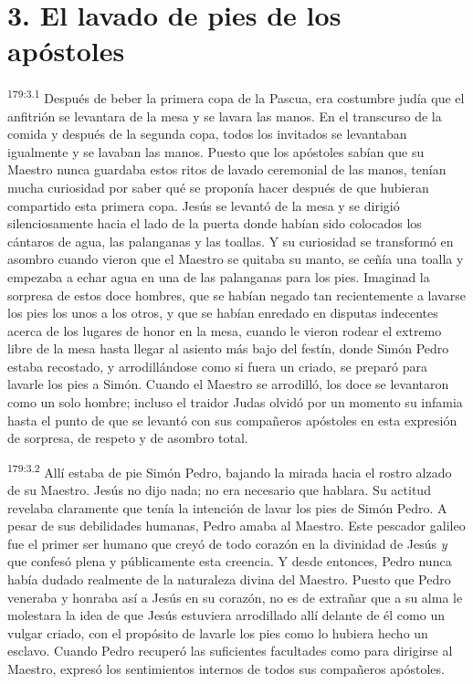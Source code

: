 \section*{3. El lavado de pies de los apóstoles}
\par 
\textsuperscript{179:3.1} Después de beber la primera copa de la Pascua, era costumbre judía que el anfitrión se levantara de la mesa y se lavara las manos. En el transcurso de la comida y después de la segunda copa, todos los invitados se levantaban igualmente y se lavaban las manos. Puesto que los apóstoles sabían que su Maestro nunca guardaba estos ritos de lavado ceremonial de las manos, tenían mucha curiosidad por saber qué se proponía hacer después de que hubieran compartido esta primera copa. Jesús se levantó de la mesa y se dirigió silenciosamente hacia el lado de la puerta donde habían sido colocados los cántaros de agua, las palanganas y las toallas. Y su curiosidad se transformó en asombro cuando vieron que el Maestro se quitaba su manto, se ceñía una toalla y empezaba a echar agua en una de las palanganas para los pies. Imaginad la sorpresa de estos doce hombres, que se habían negado tan recientemente a lavarse los pies los unos a los otros, y que se habían enredado en disputas indecentes acerca de los lugares de honor en la mesa, cuando le vieron rodear el extremo libre de la mesa hasta llegar al asiento más bajo del festín, donde Simón Pedro estaba recostado, y arrodillándose como si fuera un criado, se preparó para lavarle los pies a Simón. Cuando el Maestro se arrodilló, los doce se levantaron como un solo hombre; incluso el traidor Judas olvidó por un momento su infamia hasta el punto de que se levantó con sus compañeros apóstoles en esta expresión de sorpresa, de respeto y de asombro total.

\par 
\textsuperscript{179:3.2} Allí estaba de pie Simón Pedro, bajando la mirada hacia el rostro alzado de su Maestro. Jesús no dijo nada; no era necesario que hablara. Su actitud revelaba claramente que tenía la intención de lavar los pies de Simón Pedro. A pesar de sus debilidades humanas, Pedro amaba al Maestro. Este pescador galileo fue el primer ser humano que creyó de todo corazón en la divinidad de Jesús \textit{y} que confesó plena y públicamente esta creencia. Y desde entonces, Pedro nunca había dudado realmente de la naturaleza divina del Maestro. Puesto que Pedro veneraba y honraba así a Jesús en su corazón, no es de extrañar que a su alma le molestara la idea de que Jesús estuviera arrodillado allí delante de él como un vulgar criado, con el propósito de lavarle los pies como lo hubiera hecho un esclavo. Cuando Pedro recuperó las suficientes facultades como para dirigirse al Maestro, expresó los sentimientos internos de todos sus compañeros apóstoles.

